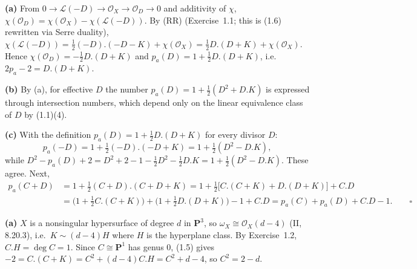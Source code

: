 \documentclass[11pt]{article}
\begin{document}
\pf
\textbf{(a)} From $0\to\mathcal L(-D)\to\mathcal O_X\to\mathcal O_D\to0$ and additivity of $\chi$, $\chi(\mathcal O_D)=\chi(\mathcal O_X)-\chi(\mathcal L(-D))$. By (RR) (Exercise~1.1; this is (1.6) rewritten via Serre duality), $\chi(\mathcal L(-D))=\frac12(-D).(-D-K)+\chi(\mathcal O_X)=\frac12D.(D+K)+\chi(\mathcal O_X)$. Hence $\chi(\mathcal O_D)=-\frac12D.(D+K)$ and $p_a(D)=1+\frac12D.(D+K)$, i.e.\ $2p_a-2=D.(D+K)$.

\textbf{(b)} By (a), for effective $D$ the number $p_a(D)=1+\frac12(D^2+D.K)$ is expressed through intersection numbers, which depend only on the linear equivalence class of $D$ by (1.1)(4).

\textbf{(c)} With the definition $p_a(D)=1+\frac12D.(D+K)$ for every divisor $D$:
\[ p_a(-D)=1+\tfrac12(-D).(-D+K)=1+\tfrac12(D^2-D.K), \]
while $D^2-p_a(D)+2=D^2+2-1-\frac12D^2-\frac12D.K=1+\frac12(D^2-D.K)$. These agree. Next,
\begin{align*}
p_a(C+D)&=1+\tfrac12(C+D).(C+D+K)=1+\tfrac12\bigl[C.(C+K)+D.(D+K)\bigr]+C.D\\
&=\bigl(1+\tfrac12C.(C+K)\bigr)+\bigl(1+\tfrac12D.(D+K)\bigr)-1+C.D=p_a(C)+p_a(D)+C.D-1.\qquad\square
\end{align*}

\pf
\textbf{(a)} $X$ is a nonsingular hypersurface of degree $d$ in $\mathbf P^3$, so $\omega_X\cong\mathcal O_X(d-4)$ (II, 8.20.3), i.e.\ $K\sim(d-4)H$ where $H$ is the hyperplane class. By Exercise~1.2, $C.H=\deg C=1$. Since $C\cong\mathbf P^1$ has genus $0$, (1.5) gives $-2=C.(C+K)=C^2+(d-4)C.H=C^2+d-4$, so $C^2=2-d$.
\end{document}
